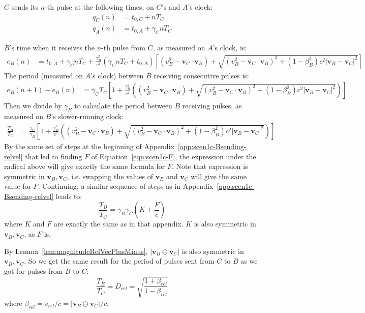 \documentclass[a4paper]{article}
\theoremstyle{plain}
\theoremstyle{definition}
\newcommand{\vect}[1]{\mathbf{#1}}
\begin{document}
$C$ sends its $n$-th pulse at the following times, on $C$'s and $A$'s
clock:
\begin{align}
q_C(n) & = t_{0,C} + nT_C \\
q_A(n) & = t_{0,A} + \gamma_C nT_C
\end{align}

$B$'s time when it receives the $n$-th pulse from $C$, as measured on
$A$'s clock, is:
\begin{align*}
e_{B}(n)
  & = t_{0,A} + \gamma_C nT_C + \frac{\gamma_B^2}{c^2} (\gamma_C nT_C + t_{0,A}) \left[ (v_B^2 - \vect{v}_C \cdot \vect{v}_B) + \sqrt{ (v_B^2 - \vect{v}_C \cdot \vect{v}_B)^2  + (1-\beta_B^2)c^2 |\vect{v}_B - \vect{v}_C|^2 } \right]
\end{align*}
The period (measured on $A$'s clock) between $B$ receiving consecutive
pulses is:
\begin{align*}
e_{B}(n+1) - e_{B}(n)
  & = \gamma_C T_C \left[ 1 + \frac{\gamma_B^2}{c^2} \left( (v_B^2 - \vect{v}_C \cdot \vect{v}_B) + \sqrt{ (v_B^2 - \vect{v}_C \cdot \vect{v}_B)^2  + (1-\beta_B^2)c^2 |\vect{v}_B - \vect{v}_C|^2 } \right) \right]
\end{align*}
Then we divide by $\gamma_B$ to calculate the period between $B$
receiving pulses, as measured on $B$'s slower-running clock:
\begin{align*}
\frac{T_B}{T_C}
  & = \frac{\gamma_C}{\gamma_B} \left[ 1 + \frac{\gamma_B^2}{c^2} \left( (v_B^2 - \vect{v}_C \cdot \vect{v}_B) + \sqrt{ (v_B^2 - \vect{v}_C \cdot \vect{v}_B)^2  + (1-\beta_B^2)c^2 |\vect{v}_B - \vect{v}_C|^2 } \right) \right]
\end{align*}
By the same set of steps at the beginning of
Appendix~\ref{app:scen1c-Bsending-relvel} that led to finding $F$ of
Equation~\eqref{eqn:scen1c-F}, the expression under the radical above
will give exactly the same formula for $F$.  Note that expression is
symmetric in $\vect{v}_B, \vect{v}_C$, i.e. swapping the values of
$\vect{v}_B$ and $\vect{v}_C$ will give the same value for $F$.
Continuing, a similar sequence of steps as in
Appendix~\ref{app:scen1c-Bsending-relvel} leads to:
\begin{equation}
\frac{T_B}{T_C}
  = \gamma_B \gamma_C \left( K + \frac{F}{c} \right) \label{eqn:scen1c-TC5}
\end{equation}
where $K$ and $F$ are exactly the same as in that appendix.
$K$ is also symmetric in $\vect{v}_B, \vect{v}_C$, as $F$ is.

By Lemma~\ref{lem:magnitudeRelVecPlusMinus},
$|\vect{v}_B \ominus \vect{v}_C|$ is also symmetric in
$\vect{v}_B, \vect{v}_C$.
So we get the same result for the period of pulses sent from $C$ to
$B$ as we got for pulses from $B$ to $C$:
\begin{equation}
\frac{T_B}{T_C}
  = D_{rel}
  = \sqrt{ \frac{1+\beta_{rel}}{1-\beta_{rel}} }
\end{equation}
where $\beta_{rel} = v_{rel}/c = |\vect{v}_B \ominus \vect{v}_C|/c$.
\end{document}
